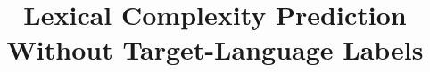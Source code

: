 \usepackage{times}
\usepackage{latexsym}

\usepackage[T1]{fontenc}

\usepackage[utf8]{inputenc}

\usepackage{microtype}

\usepackage{inconsolata}

\usepackage{graphicx}

%
%

\usepackage{booktabs}          %
\graphicspath{{figures/}}

\renewcommand{\topfraction}{0.9}
\renewcommand{\bottomfraction}{0.5}
\renewcommand{\textfraction}{0.08}
\renewcommand{\floatpagefraction}{0.8}

\title{Lexical Complexity Prediction Without Target-Language Labels}

